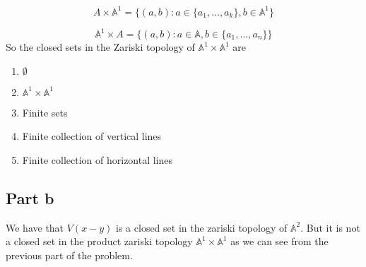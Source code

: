 \documentclass[12pt]{article}
\begin{document}
$$A \times \mathbb{A}^1  = \{(a,b): a \in \{a_1,...,a_k\}, b \in \mathbb{A}^1 \}$$ 

$$ \mathbb{A}^1 \times A  = \{(a,b): a \in \mathbb{A}, b \in \{a_1,...,a_n\} \}$$
So the closed sets in the Zariski topology of $\mathbb{A}^1 \times \mathbb{A}^1$ are
\begin{enumerate}
\item $\emptyset$
\item $\mathbb{A}^1 \times \mathbb{A}^1$
\item Finite sets
\item Finite collection of vertical lines
\item Finite collection of horizontal lines
\end{enumerate}
\subsection*{Part b}
We have that $V(x-y)$ is a closed set in the zariski topology of $\mathbb{A}^2$. But it is not a closed set in the product zariski topology $\mathbb{A}^1 \times \mathbb{A}^1$ as we can see from the previous part of the problem.
\end{document}
